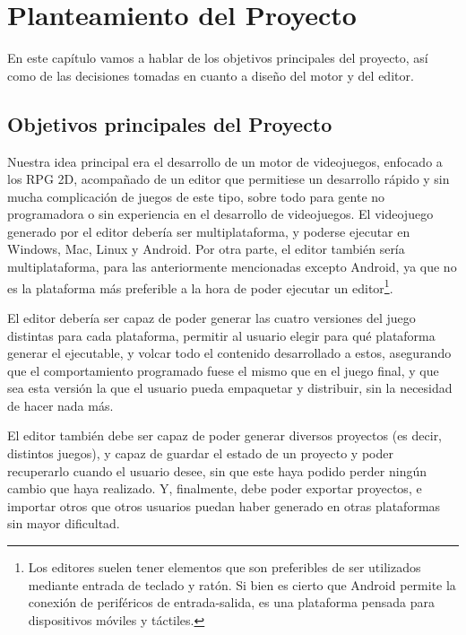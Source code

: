 \chapter{Planteamiento del Proyecto}
\label{cap:planteamiento}

\begin{resumen}
En este capítulo vamos a hablar de los objetivos principales del proyecto, así como de las decisiones tomadas en cuanto a diseño del motor y del editor.
\end{resumen}

\section{Objetivos principales del Proyecto}
Nuestra idea principal era el desarrollo de un motor de videojuegos, enfocado a los RPG 2D, acompañado de un editor que permitiese un desarrollo rápido y sin mucha complicación de juegos de este tipo, sobre todo para gente no programadora o sin experiencia en el desarrollo de videojuegos. El videojuego generado por el editor debería ser multiplataforma, y poderse ejecutar en Windows, Mac, Linux y Android. Por otra parte, el editor también sería multiplataforma, para las anteriormente mencionadas excepto Android, ya que no es la plataforma más preferible a la hora de poder ejecutar un editor\footnote{Los editores suelen tener elementos que son preferibles de ser utilizados mediante entrada de teclado y ratón. Si bien es cierto que Android permite la conexión de periféricos de entrada-salida, es una plataforma pensada para dispositivos móviles y táctiles.}. 

\medskip

El editor debería ser capaz de poder generar las cuatro versiones del juego distintas para cada plataforma, permitir al usuario elegir para qué plataforma generar el ejecutable, y volcar todo el contenido desarrollado a estos, asegurando que el comportamiento programado fuese el mismo que en el juego final, y que sea esta versión la que el usuario pueda empaquetar y distribuir, sin la necesidad de hacer nada más.

\smallskip

El editor también debe ser capaz de poder generar diversos proyectos (es decir, distintos juegos), y capaz de guardar el estado de un proyecto y poder recuperarlo cuando el usuario desee, sin que este haya podido perder ningún cambio que haya realizado. Y, finalmente, debe poder exportar proyectos, e importar otros que otros usuarios puedan haber generado en otras plataformas sin mayor dificultad.


